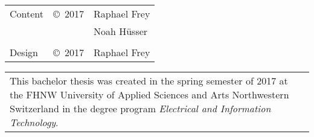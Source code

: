 
\vspace*{30mm}

\begin{tiny}
    \begin{tabular}{lll}
        Content & \copyright~2017 & Raphael Frey \\
                &                  & Noah Hüsser  \\
                &                  &              \\
        Design  & \copyright~2017  & Raphael Frey \\
    \end{tabular}


    \vspace{3em}
    \begin{tabular}{p{}}
        This bachelor thesis was created in the spring semester of 2017 at the
        FHNW University of Applied  Sciences and Arts Northwestern Switzerland
        in the degree program \emph{Electrical and Information Technology}.\\


\end{tabular}
\end{tiny}
